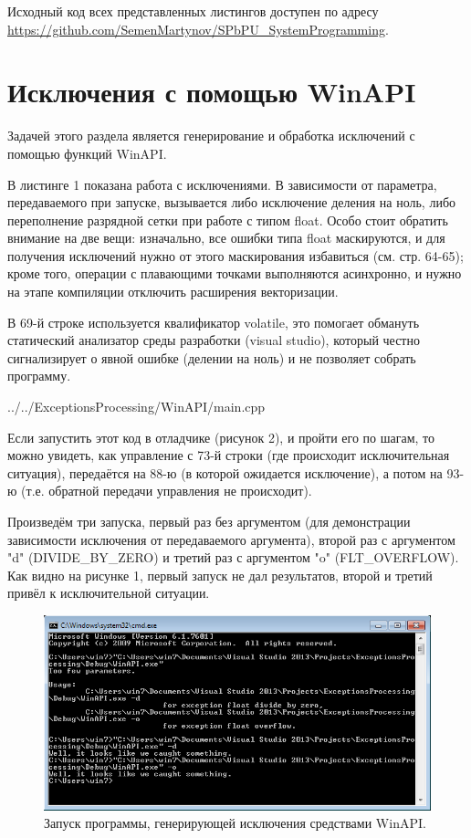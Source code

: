 \documentclass[a4paper, 12pt]{report}		%
\begin{document}
\vspace{1em}
Исходный код всех представленных листингов доступен по адресу \\ \url{https://github.com/SemenMartynov/SPbPU_SystemProgramming}.

\chapter*{Исключения с помощью WinAPI}

Задачей этого раздела является генерирование и обработка исключений с помощью функций WinAPI.

В листинге 1 показана работа с исключениями. В зависимости от параметра, передаваемого при запуске, вызывается либо исключение деления на ноль, либо переполнение разрядной сетки при работе с типом float. Особо стоит обратить внимание на две вещи: изначально, все ошибки типа float маскируются, и для получения исключений нужно от этого маскирования избавиться (см. стр. 64-65); кроме того, операции с плавающими точками выполняются асинхронно, и нужно на этапе компиляции отключить расширения векторизации.

В 69-й строке используется квалификатор volatile, это помогает обмануть статический анализатор среды разработки (visual studio), который честно сигнализирует о явной ошибке (делении на ноль) и не позволяет собрать программу.


{../../ExceptionsProcessing/WinAPI/main.cpp}


Если запустить этот код в отладчике (рисунок 2), и пройти его по шагам, то можно увидеть, как управление с 73-й строки (где происходит исключительная ситуация),  передаётся на 88-ю (в которой ожидается исключение), а потом на 93-ю (т.е. обратной передачи управления не происходит).

Произведём три запуска, первый раз без аргументом (для демонстрации зависимости исключения от передаваемого аргумента), второй раз с аргументом "\-d" (DIVIDE\_BY\_ZERO) и третий раз с аргументом "\-o" (FLT\_OVERFLOW). Как видно на рисунке 1, первый запуск не дал результатов, второй и третий привёл к исключительной ситуации.

\begin{figure}[h!]
\centering
\includegraphics[scale=0.95]{res/001}
\caption{Запуск программы, генерирующей исключения средствами WinAPI.}
\end{figure}
\end{document}
